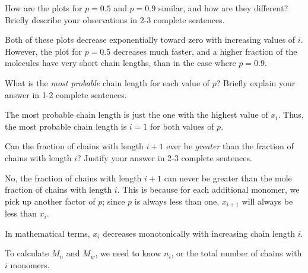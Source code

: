 \begin{activity}
\begin{ctqs}
	\clearpage
	\question How are the plots for $p=0.5$ and $p=0.9$ similar, and how are they different?  Briefly describe your observations in 2-3 complete sentences.
	
		\begin{solution}[1.5in]
		
			Both of these plots decrease exponentially toward zero with increasing values of $i$.  However, the plot for $p=0.5$ decreases much faster, and a higher fraction of the molecules have very short chain lengths, than in the case where $p=0.9$.
		\end{solution}
	
	\question What is the \emph{most probable} chain length for each value of $p$?  Briefly explain your answer in 1-2 complete sentences.
	
		\begin{solution}[1.5in]
		
			The most probable chain length is just the one with the highest value of $x_i$.  Thus, the most probable chain length is $i=1$ for both values of $p$.
		
		\end{solution}
	
	\question Can the fraction of chains with length $i+1$ ever be \emph{greater} than the fraction of chains with length $i$?  Justify your answer in 2-3 complete sentences.
	
		\begin{solution}[1.5in]
		
			No, the fraction of chains with length $i+1$ can never be greater than the mole fraction of chains with length $i$.  This is because for each additional monomer, we pick up another factor of $p$; since $p$ is always less than one, $x_{i+1}$ will always be less than $x_i$.
			
			In mathematical terms, $x_i$ decreases monotonically with increasing chain length $i$.
		
		\end{solution}
	
\end{ctqs}

\clearpage
\begin{model}
\label{\labelbase:mdl:MwMn}

	To calculate $M_n$ and $M_w$, we need to know $n_i$, or the total number of chains with $i$ monomers.
	

\end{model}
\end{activity}
